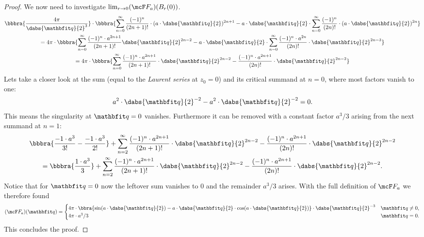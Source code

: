 \begin{proof}
    We now need to investigate $\lim_{r\to 0}(\mcF F_a)(B_r(0))$. 
    \begin{multline*}
        \bbbra{
            \frac{4\pi}{\dabs{\vq}{2}^3}
        }\cdot\bbbra{
            \sum_{n = 0}^\infty\frac{(-1)^n}{(2n + 1)!}\cdot(a\cdot\dabs{\vq}{2})^{2n + 1} - a\cdot\dabs{\vq}{2}\cdot\sum_{n = 0}^\infty\frac{(-1)^n}{(2n)!}\cdot(a\cdot\dabs{\vq}{2})^{2n}
        } \\
        = 4\pi\cdot\bbbra{
            \sum_{n = 0}^\infty\frac{(-1)^n\cdot a^{2n+1}}{(2n + 1)!}\dabs{\vq}{2}^{2n-2} - a\cdot\dabs{\vq}{2}\cdot\sum_{n = 0}^\infty\frac{(-1)^n\cdot a^{2n}}{(2n)!}\cdot\dabs{\vq}{2}^{2n-3}
        } \\
        = 4\pi\cdot\bbbra{
            \sum_{n=0}^\infty\frac{(-1)^n\cdot a^{2n+1}}{(2n+1)!}\cdot\dabs{\vq}{2}^{2n-2} - \frac{(-1)^n\cdot a^{2n+1}}{(2n)!}\cdot\dabs{\vq}{2}^{2n-2}
        }
    \end{multline*}
    Lets take a closer look at the sum (equal to the \emph{Laurent series} at $z_0 = 0$) and its critical summand at $n = 0$, where most factors vanish to one:
    \[
        a^2\cdot\dabs{\vq}{2}^{-2} - a^2\cdot\dabs{\vq}{2}^{-2} = 0.
    \]
    This means the singularity at $\vq = 0$ vanishes. Furthermore it can be removed with a constant factor $a^3/3$ arising from the next summand at $n=1$:
    \begin{multline*}
        \bbbra{
            \frac{-1\cdot a^3}{3!}-\frac{-1\cdot a^3}{2!}
        } + \sum_{n=2}^\infty\frac{(-1)^n\cdot a^{2n+1}}{(2n+1)!}\cdot\dabs{\vq}{2}^{2n-2} - \frac{(-1)^n\cdot a^{2n+1}}{(2n)!}\cdot\dabs{\vq}{2}^{2n-2} \\
        = \bbbra{\frac{1\cdot a^3}{3}} + \sum_{n=2}^\infty\frac{(-1)^n\cdot a^{2n+1}}{(2n+1)!}\cdot\dabs{\vq}{2}^{2n-2} - \frac{(-1)^n\cdot a^{2n+1}}{(2n)!}\cdot\dabs{\vq}{2}^{2n-2}.
    \end{multline*}
    Notice that for $\vq = 0$ now the leftover sum vanishes to $0$ and the remainder $a^3/3$ arises. With the full definition of $\mcF F_a$ we therefore found
    \[
        (\mcF F_a)(\vq) = \begin{cases}
            4\pi\cdot\bbra{\sin(a\cdot\dabs{\vq}{2}) - a\cdot\dabs{\vq}{2}\cdot\cos(a\cdot\dabs{\vq}{2})}\cdot\dabs{\vq}{2}^{-3} & \vq\neq 0, \\
            4\pi\cdot a^3/3 & \vq = 0.
        \end{cases}
    \] 
    This concludes the proof.
\end{proof}